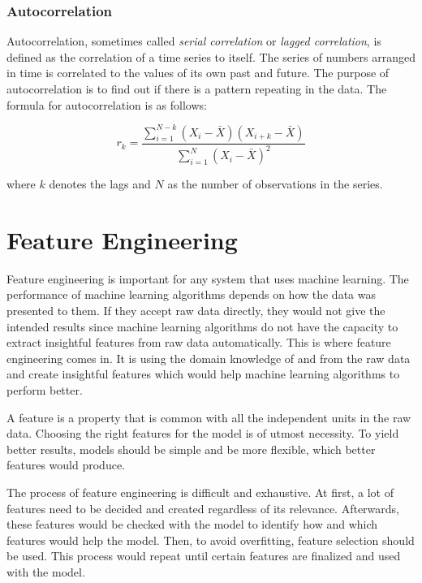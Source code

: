 \subsubsection{Autocorrelation}
Autocorrelation, sometimes called \textit{serial correlation} or \textit{lagged correlation}, is defined as the correlation of a time series to itself. The series of numbers arranged in time is correlated to the values of its own past and future. The purpose of autocorrelation is to find out if there is a pattern repeating in the data. The formula for autocorrelation is as follows: 

\begin{equation}
r_{k} = \frac{\sum_{i=1}^{N-k}(X_{i} - \bar{X})(X_{i+k} - \bar{X})} {\sum_{i=1}^{N}(X_{i} - \bar{X})^{2} }
\end{equation}

\noindent where $k$ denotes the lags and $N$ as the number of observations in the series.




\section{Feature Engineering}
Feature engineering is important for any system that uses machine learning. The performance of machine learning algorithms depends on how the data was presented to them. If they accept raw data directly, they would not give the intended results since machine learning algorithms do not have the capacity to extract insightful features from raw data automatically. This is where feature engineering comes in. It is using the domain knowledge of and from the raw data and create insightful features which would help machine learning algorithms to perform better. 

A feature is a property that is common with all the independent units in the raw data. Choosing the right features for the model is of utmost necessity. To yield better results, models should be simple and be more flexible, which better features would produce.

The process of feature engineering is difficult and exhaustive. At first, a lot of features need to be decided and created regardless of its relevance. Afterwards, these features would be checked with the model to identify how and which features would help the model. Then, to avoid overfitting, feature selection should be used. This process would repeat until certain features are finalized and used with the model.





